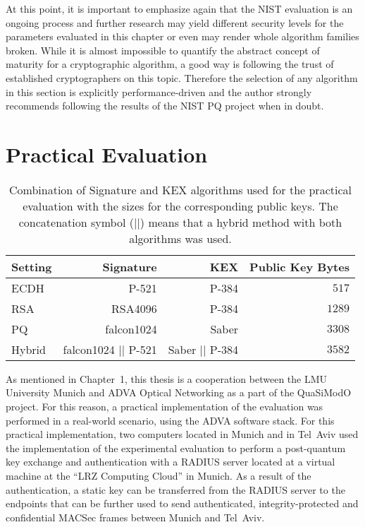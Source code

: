 At this point, it is important to emphasize again that the NIST evaluation is an ongoing process and further research may yield different security levels for the parameters evaluated in this chapter or even may render whole algorithm families broken. While it is almost impossible to quantify the abstract concept of maturity for a cryptographic algorithm, a good way is following the trust of established cryptographers on this topic. Therefore the selection of any algorithm in this section is explicitly performance-driven and the author strongly recommends following the results of the \ac{NIST} \ac{PQ} project when in doubt.

\section{Practical Evaluation}

\begin{table}[h]
    \begin{center}
        \caption{Combination of Signature and KEX algorithms used for the practical evaluation with the sizes for the corresponding public keys. The concatenation symbol (\(\vert\vert\)) means that a hybrid method with both algorithms was used.}
        \begin{tabular}{lrrr}
            \hline
        \textbf{Setting} & \textbf{Signature} & \textbf{KEX} & \textbf{Public Key Bytes}  \\
        \hline
        ECDH & P-521 & P-384 & \(517\) \\
        \hline
        RSA & RSA4096 & P-384 & \(1289\) \\
        \hline
        PQ & falcon1024 & Saber & \(3308\) \\
        \hline
        Hybrid & falcon1024 \(\vert\vert\) P-521 & Saber \(\vert\vert\) P-384 & \(3582\) \\
        \hline
        \end{tabular}
        \label{table:pubkeysizes_practical}
    \end{center}
\end{table}

As mentioned in Chapter~1, this thesis is a cooperation between the LMU University Munich and ADVA Optical Networking as a part of the QuaSiModO project. For this reason, a practical implementation of the evaluation was performed in a real-world scenario, using the ADVA software stack. For this practical implementation, two computers located in Munich and in Tel~Aviv used the implementation of the experimental evaluation to perform a post-quantum key exchange and authentication with a RADIUS server located at a virtual machine at the ``LRZ Computing Cloud'' in Munich. As a result of the authentication, a static key can be transferred from the RADIUS server to the endpoints that can be further used to send authenticated, integrity-protected and confidential MACSec frames between Munich and Tel~Aviv. 

